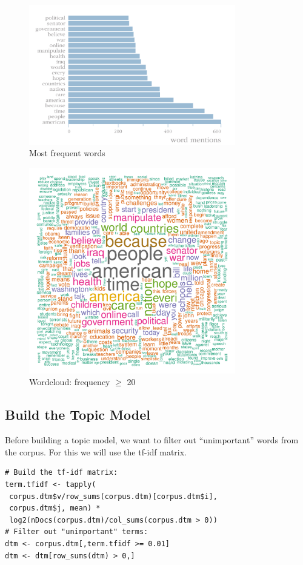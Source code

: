\documentclass[%
	final,
	notitlepage,
	narroweqnarray,
	inline,
	]{ieee}
\begin{document}
\begin{figure}[ht!]
\centering
\includegraphics[width=90mm]{mostfreq.pdf}
\caption{Most frequent words}
\label{fig:barchart}
\end{figure}

\begin{figure}[ht!]
\centering
\includegraphics[width=90mm]{wordcloud.pdf}
\caption{Wordcloud: frequency $\geq$ 20}
\label{fig:wordcloud}
\end{figure}

\subsection{Build the Topic Model}

\PARstart Before building a topic model, we want to filter out ``unimportant'' words from
the corpus. For this we will use the tf-idf matrix.

\begin{verbatim}
# Build the tf-idf matrix:
term.tfidf <- tapply(
 corpus.dtm$v/row_sums(corpus.dtm)[corpus.dtm$i], 
 corpus.dtm$j, mean) * 
 log2(nDocs(corpus.dtm)/col_sums(corpus.dtm > 0))
# Filter out "unimportant" terms:
dtm <- corpus.dtm[,term.tfidf >= 0.01]
dtm <- dtm[row_sums(dtm) > 0,]
\end{verbatim}
\end{document}
